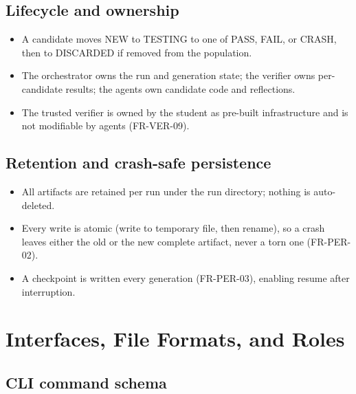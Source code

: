 \documentclass[12pt,a4paper]{article}
\begin{document}
\subsection{Lifecycle and ownership}

\begin{itemize}
  \item A candidate moves NEW to TESTING to one of PASS, FAIL, or CRASH, then to DISCARDED if removed from the population.
  \item The orchestrator owns the run and generation state; the verifier owns per-candidate results; the agents own candidate code and reflections.
  \item The trusted verifier is owned by the student as pre-built infrastructure and is not modifiable by agents (FR-VER-09).
\end{itemize}

\subsection{Retention and crash-safe persistence}

\begin{itemize}
  \item All artifacts are retained per run under the run directory; nothing is auto-deleted.
  \item Every write is atomic (write to temporary file, then rename), so a crash leaves either the old or the new complete artifact, never a torn one (FR-PER-02).
  \item A checkpoint is written every generation (FR-PER-03), enabling resume after interruption.
\end{itemize}

\section{Interfaces, File Formats, and Roles}
\label{sec:interfaces}

\subsection{CLI command schema}
\end{document}
